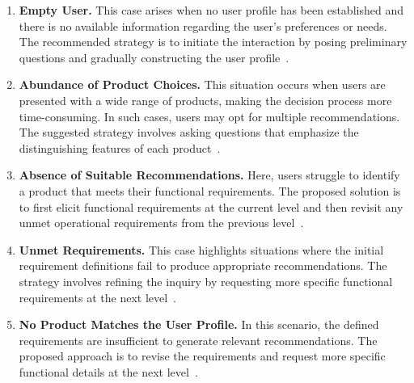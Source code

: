 \begin{enumerate}[label=\alph*)]
	\item \textbf{Empty User.} This case arises when no user profile has been established and there is no available information regarding the user’s preferences or needs. The recommended strategy is to initiate the interaction by posing preliminary questions and gradually constructing the user profile~\parencite{ayundhita2019}.  
	
	\item \textbf{Abundance of Product Choices.} This situation occurs when users are presented with a wide range of products, making the decision process more time-consuming. In such cases, users may opt for multiple recommendations. The suggested strategy involves asking questions that emphasize the distinguishing features of each product~\parencite{ayundhita2019}.  
	
	\item \textbf{Absence of Suitable Recommendations.} Here, users struggle to identify a product that meets their functional requirements. The proposed solution is to first elicit functional requirements at the current level and then revisit any unmet operational requirements from the previous level~\parencite{ayundhita2019}.  
	
	\item \textbf{Unmet Requirements.} This case highlights situations where the initial requirement definitions fail to produce appropriate recommendations. The strategy involves refining the inquiry by requesting more specific functional requirements at the next level~\parencite{ayundhita2019}.  
	
	\item \textbf{No Product Matches the User Profile.} In this scenario, the defined requirements are insufficient to generate relevant recommendations. The proposed approach is to revise the requirements and request more specific functional details at the next level~\parencite{ayundhita2019}.  
\end{enumerate}

